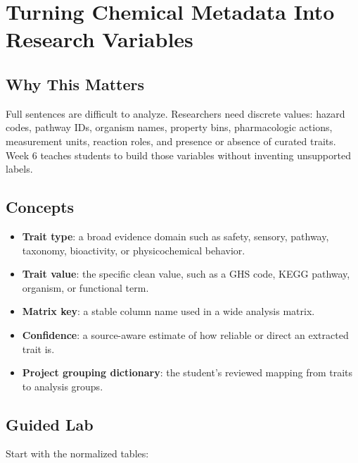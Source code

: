 \chapter{Turning Chemical Metadata Into Research Variables}


\section{Why This Matters}
Full sentences are difficult to analyze. Researchers need discrete values: hazard codes, pathway IDs, organism names, property bins, pharmacologic actions, measurement units, reaction roles, and presence or absence of curated traits. Week 6 teaches students to build those variables without inventing unsupported labels.

\section{Concepts}
\begin{itemize}
  \item \textbf{Trait type}: a broad evidence domain such as safety, sensory, pathway, taxonomy, bioactivity, or physicochemical behavior.
  \item \textbf{Trait value}: the specific clean value, such as a GHS code, KEGG pathway, organism, or functional term.
  \item \textbf{Matrix key}: a stable column name used in a wide analysis matrix.
  \item \textbf{Confidence}: a source-aware estimate of how reliable or direct an extracted trait is.
  \item \textbf{Project grouping dictionary}: the student's reviewed mapping from traits to analysis groups.
\end{itemize}

\section{Guided Lab}
Start with the normalized tables:


